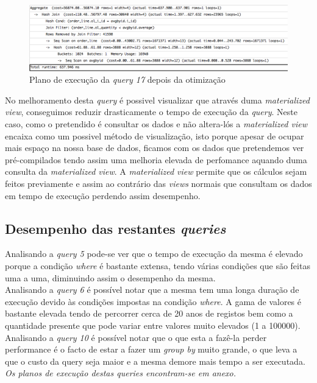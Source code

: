 \begin{figure}[h!]
\centering
\includegraphics[width=\textwidth]{img/00_query17_pos}
\caption{Plano de execução da \textit{query 17} depois da otimização \label{overflow}}
\end{figure}


No melhoramento desta \textit{query} é possivel visualizar que através duma \textit{materialized view}, conseguimos reduzir drasticamente o tempo de execução da \textit{query}. Neste caso, como o pretendido é consultar os dados e não altera-lós a \textit{materialized view} encaixa como um possivel método de visualização, isto porque apesar de ocupar mais espaço na nossa base de dados, ficamos com os dados que pretendemos ver pré-compilados tendo assim uma melhoria elevada de perfomance aquando duma consulta da \textit{materialized view}. A \textit{materialized view} permite que os cálculos sejam feitos previamente e assim ao contrário das \textit{views} normais que consultam os dados em tempo de execução perdendo assim desempenho. 

\newpage

\subsection{Desempenho das restantes \textit{queries}}

Analisando a \textit{query 5} pode-se ver que o tempo de execução da mesma é elevado porque a condição \textit{where} é bastante extensa, tendo várias condições que são feitas uma a uma, diminuindo assim o desempenho da mesma.\\

Analisando a \textit{query 6} é possível notar que a mesma tem uma longa duração de execução devido às condições impostas na condição \textit{where}. A gama de valores é bastante elevada tendo de percorrer cerca de 20 anos de registos bem como a quantidade presente que pode variar entre valores muito elevados (1 a 100000).\\

Analisando a \textit{query 10} é possível notar que o que esta a fazê-la perder performance é o facto de estar a fazer um \textit{group by} muito grande, o que leva a que o custo da query seja maior e a mesma demore mais tempo a ser executada.\\

\textit{Os planos de execução destas queries encontram-se em anexo.}
